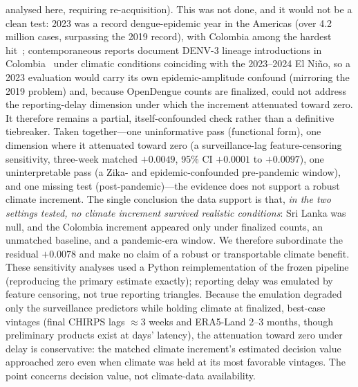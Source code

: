 \documentclass[11pt,a4paper]{article}
\begin{document}
analysed here, requiring re-acquisition). This was not done, and it would not be a clean test: 2023 was a record dengue-epidemic year in the Americas (over 4.2 million cases, surpassing the 2019 record), with Colombia among the hardest hit~\cite{PAHO2023}; contemporaneous reports document DENV-3 lineage introductions in Colombia~\cite{ValleDelCauca2024} under climatic conditions coinciding with the 2023--2024 El Ni\~no, so a 2023 evaluation would carry its own epidemic-amplitude confound (mirroring the 2019 problem) and, because OpenDengue counts are finalized, could not address the reporting-delay dimension under which the increment attenuated toward zero. It therefore remains a partial, itself-confounded check rather than a definitive tiebreaker. Taken together---one uninformative pass (functional form), one dimension where it attenuated toward zero (a surveillance-lag feature-censoring sensitivity, three-week matched $+0.0049$, 95\% CI $+0.0001$ to $+0.0097$), one uninterpretable pass (a Zika- and epidemic-confounded pre-pandemic window), and one missing test (post-pandemic)---the evidence does not support a robust climate increment. The single conclusion the data support is that, \emph{in the two settings tested, no climate increment survived realistic conditions}: Sri Lanka was null, and the Colombia increment appeared only under finalized counts, an unmatched baseline, and a pandemic-era window. We therefore subordinate the residual $+0.0078$ and make no claim of a robust or transportable climate benefit. These sensitivity analyses used a Python reimplementation of the frozen pipeline (reproducing the primary estimate exactly); reporting delay was emulated by feature censoring, not true reporting triangles. Because the emulation degraded only the surveillance predictors while holding climate at finalized, best-case vintages (final CHIRPS lags $\approx$3 weeks and ERA5-Land 2--3 months, though preliminary products exist at days' latency), the attenuation toward zero under delay is conservative: the matched climate increment's estimated decision value approached zero even when climate was held at its most favorable vintages. The point concerns decision value, not climate-data availability.
\end{document}
